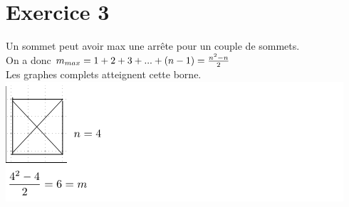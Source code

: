 \documentclass{article}
\begin{document}
\section*{Exercice 3}
Un sommet peut avoir max une arrête pour un couple de sommets. \\
On a donc $m_{max}=1+2+3+...+(n-1)={{n^{2}-n} \over 2}$ \\
Les graphes complets atteignent cette borne. \\
\includegraphics{Image/S2.PNG}
\newpage
\end{document}
